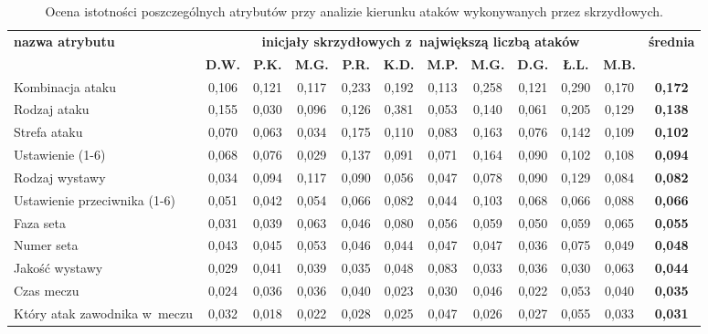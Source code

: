\documentclass[a4paper,twoside,12pt]{book}
\begin{document}
\begin{table}
\centering
\caption{Ocena istotności poszczególnych atrybutów przy analizie kierunku ataków wykonywanych przez skrzydłowych.}
\label{tab:atrybutyAtak}
\begin{adjustbox}{angle=90}
\begin{tabular}{|l|c|c|c|c|c|c|c|c|c|c|c|}
\hline
\multirow{2}{*}{\textbf{nazwa atrybutu}} &
\multicolumn{10}{c|}{\textbf{inicjały skrzydłowych z~największą liczbą ataków}} & 
\multirow{2}{*}{\textbf{średnia}}\\
\cline{2-11} & \textbf{D.W.} & \textbf{P.K.} & \textbf{M.G.} & \textbf{P.R.} & \textbf{K.D.} & \textbf{M.P.} & \textbf{M.G.} & \textbf{D.G.} & \textbf{Ł.L.} & \textbf{M.B.} &\\
\hline
Kombinacja ataku & 0,106 & \cellcolor{green}0,121 & \cellcolor{green}0,117 & \cellcolor{green}0,233 & 0,192 & \cellcolor{green}0,113 & \cellcolor{green}0,258 & \cellcolor{green}0,121 & \cellcolor{green}0,290 & \cellcolor{green}0,170 & \textbf{0,172} \\ \hline
Rodzaj ataku & \cellcolor{green}0,155 & 0,030 & 0,096 & 0,126 & \cellcolor{green}0,381 & 0,053 & 0,140 & 0,061 & 0,205 & 0,129 & \textbf{0,138} \\ \hline
Strefa ataku & 0,070 & 0,063 & 0,034 & 0,175 & 0,110 & 0,083 & 0,163 & 0,076 & 0,142 & 0,109 & \textbf{0,102} \\ \hline
Ustawienie (1-6) & 0,068 & 0,076 & 0,029 & 0,137 & 0,091 & 0,071 & 0,164 & 0,090 & 0,102 & 0,108 & \textbf{0,094} \\ \hline
Rodzaj wystawy & 0,034 & 0,094 & \cellcolor{green}0,117 & 0,090 & 0,056 & 0,047 & 0,078 & 0,090 & 0,129 & 0,084 & \textbf{0,082} \\ \hline
Ustawienie przeciwnika (1-6) & 0,051 & 0,042 & 0,054 & 0,066 & 0,082 & 0,044 & 0,103 & 0,068 & 0,066 & 0,088 & \textbf{0,066} \\ \hline
Faza seta & 0,031 & 0,039 & 0,063 & 0,046 & 0,080 & 0,056 & 0,059 & 0,050 & 0,059 & 0,065 & \textbf{0,055} \\ \hline
Numer seta & 0,043 & 0,045 & 0,053 & 0,046 & 0,044 & 0,047 & 0,047 & 0,036 & 0,075 & 0,049 & \textbf{0,048} \\ \hline
Jakość wystawy & 0,029 & 0,041 & 0,039 & 0,035 & 0,048 & 0,083 & 0,033 & 0,036 & 0,030 & 0,063 & \textbf{0,044} \\ \hline
Czas meczu & 0,024 & 0,036 & 0,036 & 0,040 & 0,023 & 0,030 & 0,046 & 0,022 & 0,053 & 0,040 & \textbf{0,035} \\ \hline
Który atak zawodnika w~meczu & 0,032 & 0,018 & 0,022 & 0,028 & 0,025 & 0,047 & 0,026 & 0,027 & 0,055 & 0,033 & \textbf{0,031} \\ \hline

\end{tabular}
\end{adjustbox}
\end{table}
\end{document}
